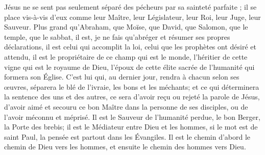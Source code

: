 Jésus ne se sent pas seulement séparé des pécheurs par sa sainteté parfaite ; il se place vis-à-vis d’eux comme leur Maître, leur Législateur, leur Roi, leur Juge, leur Sauveur.
Plus grand qu’Abraham, que Moïse, que David, que Salomon, que le temple, que le sabbat, il est, je ne fais qu’abréger et résumer ses propres déclarations, il est celui qui accomplit la loi, celui que les prophètes ont désiré et attendu, il est le propriétaire de ce champ qui est le monde, l’héritier de cette vigne qui est le royaume de Dieu, l’époux de cette élite sacrée de l’humanité qui formera son Église.
C’est lui qui, au dernier jour, rendra à chacun selon ses œuvres, séparera le blé de l’ivraie, les bons et les méchants; et ce qui déterminera la sentence des uns et des autres, ce sera d’avoir reçu ou rejeté la parole de Jésus, d’avoir aimé et secouru ce bon Maître dans la personne de ses disciples, ou de l’avoir méconnu et méprisé.
Il est le Sauveur de l’humanité perdue, le bon Berger, la Porte des brebis; il est le Médiateur entre Dieu et les hommes, \ocadr{} si le mot est de saint Paul, la pensée est partout dans les Évangiles.
Il est le chemin\frcolon{} d’abord le chemin de Dieu vers les hommes, et ensuite le chemin des hommes vers Dieu.
